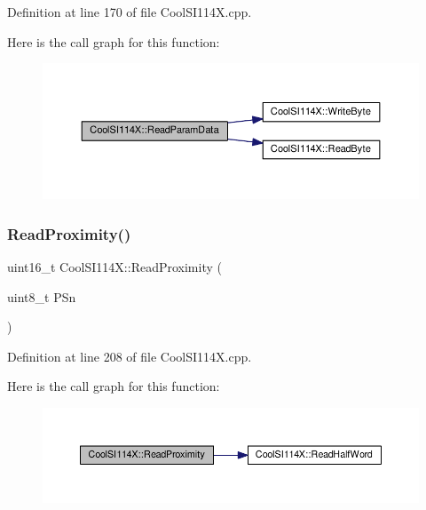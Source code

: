 Definition at line 170 of file Cool\+S\+I114\+X.\+cpp.

Here is the call graph for this function\+:\nopagebreak
\begin{figure}[H]
\begin{center}
\leavevmode
\includegraphics[width=350pt]{class_cool_s_i114_x_a33cf431103c722442f6a0cc93848d640_cgraph}
\end{center}
\end{figure}
\mbox{\label{class_cool_s_i114_x_a194fede1105508c7803dbb567cbdcc67}} 
\subsubsection{\texorpdfstring{Read\+Proximity()}{ReadProximity()}}
{\footnotesize\ttfamily uint16\+\_\+t Cool\+S\+I114\+X\+::\+Read\+Proximity (\begin{DoxyParamCaption}\item[{uint8\+\_\+t}]{P\+Sn }\end{DoxyParamCaption})}



Definition at line 208 of file Cool\+S\+I114\+X.\+cpp.

Here is the call graph for this function\+:\nopagebreak
\begin{figure}[H]
\begin{center}
\leavevmode
\includegraphics[width=350pt]{class_cool_s_i114_x_a194fede1105508c7803dbb567cbdcc67_cgraph}
\end{center}
\end{figure}
\mbox{\label{class_cool_s_i114_x_a869d3825147831d707f7ef324a665646}} 
